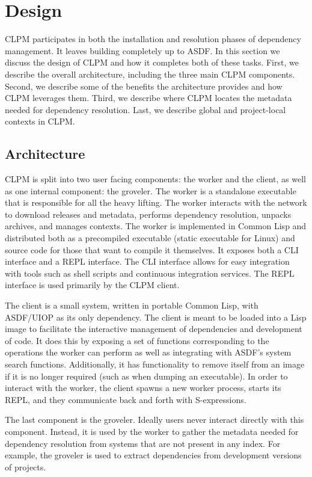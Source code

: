 \documentclass[format=sigconf]{acmart}
\begin{document}
\section{Design}

CLPM participates in both the installation and resolution phases of dependency
management. It leaves building completely up to ASDF. In this section we
discuss the design of CLPM and how it completes both of these tasks. First, we
describe the overall architecture, including the three main CLPM
components. Second, we describe some of the benefits the architecture provides
and how CLPM leverages them. Third, we describe where CLPM locates the metadata
needed for dependency resolution. Last, we describe global and project-local
contexts in CLPM.

\subsection{Architecture}\label{sec:architecture}

CLPM is split into two user facing components: the worker and the client, as
well as one internal component: the groveler. The worker is a standalone
executable that is responsible for all the heavy lifting. The worker interacts
with the network to download releases and metadata, performs dependency
resolution, unpacks archives, and manages contexts. The worker is implemented
in Common Lisp and distributed both as a precompiled executable (static
executable for Linux) and source code for those that want to compile it
themselves. It exposes both a CLI interface and a REPL interface. The CLI
interface allows for easy integration with tools such as shell scripts and
continuous integration services. The REPL interface is used primarily by the
CLPM client.

The client is a small system, written in portable Common Lisp, with ASDF/UIOP
as its only dependency. The client is meant to be loaded into a Lisp image to
facilitate the interactive management of dependencies and development of
code. It does this by exposing a set of functions corresponding to the
operations the worker can perform as well as integrating with ASDF's system
search functions. Additionally, it has functionality to remove itself from an
image if it is no longer required (such as when dumping an executable). In
order to interact with the worker, the client spawns a new worker process,
starts its REPL, and they communicate back and forth with S-expressions.

The last component is the groveler. Ideally users never interact directly with
this component. Instead, it is used by the worker to gather the metadata needed
for dependency resolution from systems that are not present in any index. For
example, the groveler is used to extract dependencies from development versions
of projects.
\end{document}
